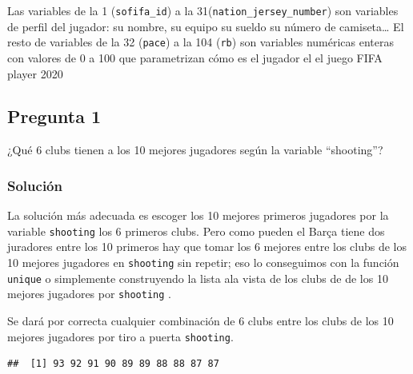 \documentclass[]{article}
\newenvironment{Shaded}{\begin{snugshade}}{\end{snugshade}}
\newcommand{\DataTypeTok}[1]{\textcolor[rgb]{0.13,0.29,0.53}{#1}}
\newcommand{\DecValTok}[1]{\textcolor[rgb]{0.00,0.00,0.81}{#1}}
\newcommand{\KeywordTok}[1]{\textcolor[rgb]{0.13,0.29,0.53}{\textbf{#1}}}
\newcommand{\NormalTok}[1]{#1}
\newcommand{\OperatorTok}[1]{\textcolor[rgb]{0.81,0.36,0.00}{\textbf{#1}}}
\newcommand{\OtherTok}[1]{\textcolor[rgb]{0.56,0.35,0.01}{#1}}
\begin{document}
Las variables de la 1 (\texttt{sofifa\_id}) a la
31(\texttt{nation\_jersey\_number}) son variables de perfil del jugador:
su nombre, su equipo su sueldo su número de camiseta\ldots{} El resto de
variables de la 32 (\texttt{pace}) a la 104 (\texttt{rb}) son variables
numéricas enteras con valores de 0 a 100 que parametrizan cómo es el
jugador el el juego FIFA player 2020

\hypertarget{pregunta-1}{%
\subsection{Pregunta 1}\label{pregunta-1}}

¿Qué 6 clubs tienen a los 10 mejores jugadores según la variable
``shooting''?

\hypertarget{soluciuxf3n}{%
\subsubsection{Solución}\label{soluciuxf3n}}

La solución más adecuada es escoger los 10 mejores primeros jugadores
por la variable \texttt{shooting} los 6 primeros clubs. Pero como pueden
el Barça tiene dos juradores entre los 10 primeros hay que tomar los 6
mejores entre los clubs de los 10 mejores jugadores en \texttt{shooting}
sin repetir; eso lo conseguimos con la función \texttt{unique} o
simplemente construyendo la lista ala vista de los clubs de de los 10
mejores jugadores por \texttt{shooting} .

Se dará por correcta cualquier combinación de 6 clubs entre los clubs de
los 10 mejores jugadores por tiro a puerta \texttt{shooting}.

\begin{Shaded}
\end{Shaded}

\begin{verbatim}
##  [1] 93 92 91 90 89 89 88 88 87 87
\end{verbatim}

\begin{Shaded}
\end{Shaded}
\end{document}
